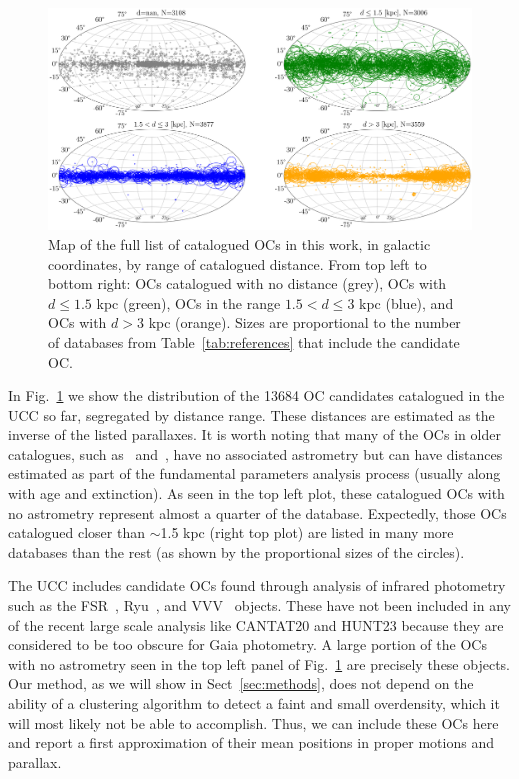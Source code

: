 \documentclass[fleqn,usenatbib]{mnras}
\begin{document}
\begin{figure}
	\includegraphics[width=\textwidth]{figs/galactic_map.png}
    \caption{Map of the full list of catalogued OCs in this work, in
    galactic coordinates, by range of catalogued distance. From top left
    to bottom right: OCs catalogued with no distance (grey), OCs with
    $d\leq1.5$ kpc (green), OCs in the range $1.5<d\leq3$ kpc (blue), and OCs
    with $d>3$ kpc (orange). Sizes are proportional to the number of
    databases from Table~\ref{tab:references} that include the candidate OC.}
    \label{fig:galactic_map}
\end{figure}

In Fig.~\ref{fig:galactic_map} we show the distribution of the 13684 OC
candidates catalogued in the UCC so far, segregated by distance range. These
distances are estimated as the inverse of the listed parallaxes. It is worth
noting that many of the OCs in older catalogues, such
as~\cite{Kharchenko_2012} and~\cite{Bica_2019}, have
no associated astrometry but can have distances estimated as part of the
fundamental parameters analysis process (usually along with age and extinction).
As seen in the top left plot, these catalogued OCs with no astrometry represent
almost a quarter of the database.
Expectedly, those OCs catalogued closer than $\sim$1.5 kpc (right top plot) are
listed in many more databases than the rest (as shown by the proportional sizes
of the circles).

The UCC includes candidate OCs found through analysis of infrared
photometry such as the FSR~\citep{Froebrich_2007}, Ryu~\citep{Ryu_2018}, and
VVV~\citep{Barba_2015} objects. These have not been included in any of the
recent large scale analysis like CANTAT20 and HUNT23 because they are considered
to be too obscure for Gaia photometry. A large portion of the OCs with no
astrometry seen in the top left panel of Fig.~\ref{fig:galactic_map} are
precisely these objects.
Our method, as we will show in Sect~\ref{sec:methods}, does not depend on the
ability of a clustering algorithm to detect a faint and small overdensity, which
it will most likely not be able to accomplish. Thus, we can include these OCs
here and report a first approximation of their mean positions in proper motions
and parallax.
\end{document}
